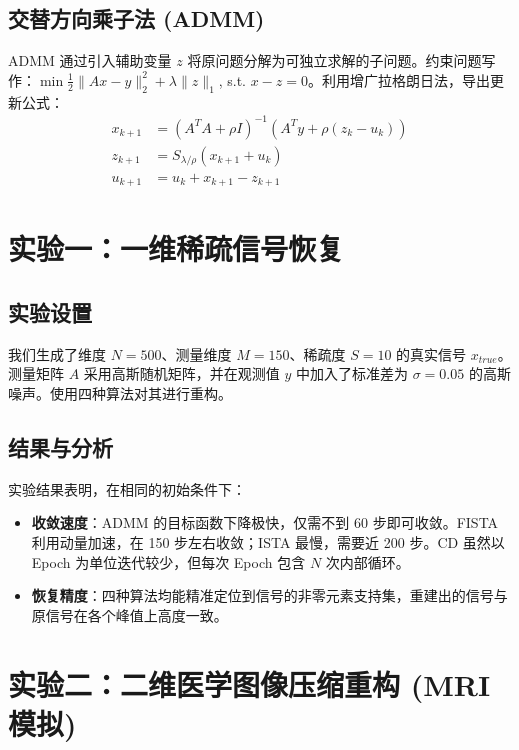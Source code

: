 \documentclass[12pt, a4paper]{ctexart}
\begin{document}
\subsection{交替方向乘子法 (ADMM)}
ADMM 通过引入辅助变量 $z$ 将原问题分解为可独立求解的子问题。约束问题写作：$\min \frac{1}{2}\|Ax - y\|_2^2 + \lambda\|z\|_1$, s.t. $x - z = 0$。利用增广拉格朗日法，导出更新公式：
\begin{align}
    x_{k+1} &= (A^TA + \rho I)^{-1}(A^Ty + \rho(z_k - u_k)) \\
    z_{k+1} &= S_{\lambda/\rho}(x_{k+1} + u_k) \\
    u_{k+1} &= u_k + x_{k+1} - z_{k+1}
\end{align}

\section{实验一：一维稀疏信号恢复}
\subsection{实验设置}
我们生成了维度 $N=500$、测量维度 $M=150$、稀疏度 $S=10$ 的真实信号 $x_{true}$。测量矩阵 $A$ 采用高斯随机矩阵，并在观测值 $y$ 中加入了标准差为 $\sigma=0.05$ 的高斯噪声。使用四种算法对其进行重构。

\subsection{结果与分析}
实验结果表明，在相同的初始条件下：
\begin{itemize}
    \item \textbf{收敛速度}：ADMM 的目标函数下降极快，仅需不到 60 步即可收敛。FISTA 利用动量加速，在 150 步左右收敛；ISTA 最慢，需要近 200 步。CD 虽然以 Epoch 为单位迭代较少，但每次 Epoch 包含 $N$ 次内部循环。
    \item \textbf{恢复精度}：四种算法均能精准定位到信号的非零元素支持集，重建出的信号与原信号在各个峰值上高度一致。
\end{itemize}

\section{实验二：二维医学图像压缩重构 (MRI 模拟)}
\end{document}
